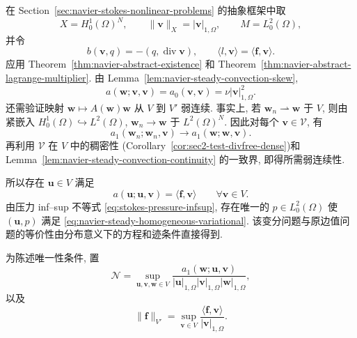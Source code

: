 \begin{Proof}
在 Section~\ref{sec:navier-stokes-nonlinear-problems} 的抽象框架中取
\[
X=H_0^1(\Omega)^N,\qquad
\|\mathbf v\|_X=|\mathbf v|_{1,\Omega},\qquad
M=L_0^2(\Omega),
\]
并令
\[
b(\mathbf v,q)=-(q,\operatorname{div}\mathbf v),
\qquad
\langle l,\mathbf v\rangle=\langle\mathbf f,\mathbf v\rangle.
\]
应用 Theorem~\ref{thm:navier-abstract-existence} 和
Theorem~\ref{thm:navier-abstract-lagrange-multiplier}. 由
Lemma~\ref{lem:navier-steady-convection-skew},
\[
a(\mathbf w;\mathbf v,\mathbf v)
=a_0(\mathbf v,\mathbf v)=\nu|\mathbf v|_{1,\Omega}^2.
\]
还需验证映射 $\mathbf w\mapsto A(\mathbf w)\mathbf w$ 从 $V$ 到 $V'$ 弱连续.
事实上, 若 $\mathbf w_n\rightharpoonup\mathbf w$ 于 $V$, 则由紧嵌入
$H_0^1(\Omega)\hookrightarrow L^2(\Omega)$,
$\mathbf w_n\to\mathbf w$ 于 $L^2(\Omega)^N$. 因此对每个
$\mathbf v\in\mathcal V$, 有
\[
a_1(\mathbf w_n;\mathbf w_n,\mathbf v)
\longrightarrow a_1(\mathbf w;\mathbf w,\mathbf v).
\]
再利用 $\mathcal V$ 在 $V$ 中的稠密性
(Corollary~\ref{cor:sec2-test-divfree-dense})和
Lemma~\ref{lem:navier-steady-convection-continuity} 的一致界, 即得所需弱连续性.

所以存在 $\mathbf u\in V$ 满足
\begin{equation}\label{eq:navier-steady-reduced-variational}
a(\mathbf u;\mathbf u,\mathbf v)
=\langle\mathbf f,\mathbf v\rangle
\qquad\forall\mathbf v\in V.
\end{equation}
由压力 inf--sup 不等式 \eqref{eq:stokes-pressure-infsup}, 存在唯一的
$p\in L_0^2(\Omega)$ 使 $(\mathbf u,p)$ 满足
\eqref{eq:navier-steady-homogeneous-variational}.
该变分问题与原边值问题的等价性由分布意义下的方程和迹条件直接得到.
\end{Proof}

为陈述唯一性条件, 置
\begin{equation}\label{eq:navier-steady-convection-constant}
\mathcal N
=\sup_{\mathbf u,\mathbf v,\mathbf w\in V}
\frac{a_1(\mathbf w;\mathbf u,\mathbf v)}
{|\mathbf u|_{1,\Omega}|\mathbf v|_{1,\Omega}|\mathbf w|_{1,\Omega}},
\end{equation}
以及
\begin{equation}\label{eq:navier-steady-force-dual-norm}
\|\mathbf f\|_{V'}
=\sup_{\mathbf v\in V}
\frac{\langle\mathbf f,\mathbf v\rangle}{|\mathbf v|_{1,\Omega}}.
\end{equation}

